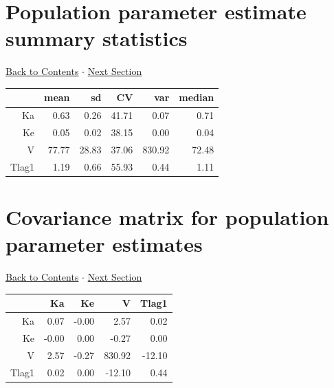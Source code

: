 \documentclass{article}
\begin{document}
          \section{Population parameter estimate summary statistics} 
 \hyperlink{tableofcontents}{Back to Contents} $\cdot$ \hyperlink{covforppe}{Next Section} \newline
          \newline 
\begin{tabular}{rrrrrr}
  \hline
 & mean & sd & CV & var & median \\ 
  \hline
Ka & 0.63 & 0.26 & 41.71 & 0.07 & 0.71 \\ 
  Ke & 0.05 & 0.02 & 38.15 & 0.00 & 0.04 \\ 
  V & 77.77 & 28.83 & 37.06 & 830.92 & 72.48 \\ 
  Tlag1 & 1.19 & 0.66 & 55.93 & 0.44 & 1.11 \\ 
   \hline
\end{tabular}
\newpage
          
          \hypertarget{covforppe}{}
          
          \section{Covariance matrix for population parameter estimates} 
 \hyperlink{tableofcontents}{Back to Contents} $\cdot$ \hyperlink{corforppe}{Next Section} \newline
          \newline 
\begin{tabular}{rrrrr}
  \hline
 & Ka & Ke & V & Tlag1 \\ 
  \hline
Ka & 0.07 & -0.00 & 2.57 & 0.02 \\ 
  Ke & -0.00 & 0.00 & -0.27 & 0.00 \\ 
  V & 2.57 & -0.27 & 830.92 & -12.10 \\ 
  Tlag1 & 0.02 & 0.00 & -12.10 & 0.44 \\ 
   \hline
\end{tabular}

          \hypertarget{corforppe}{}
          
\end{document}
